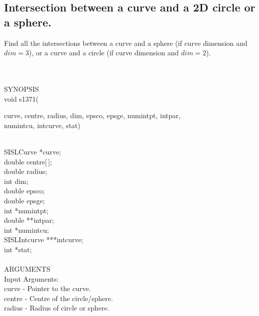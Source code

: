 \subsection{Intersection between a curve and a 2D circle or a sphere.}
\begin{minipg1}
  Find all the intersections between a curve and a sphere
  (if curve dimension and $dim=3$), or a curve and a circle
  (if curve dimension and $dim=2$).
\end{minipg1} \\ \\
SYNOPSIS\\
        \>void s1371(\begin{minipg3}
        {\fov curve}, {\fov centre}, {\fov radius}, {\fov dim}, {\fov epsco}, {\fov epsge}, {\fov numintpt}, {\fov intpar},\\
                        {\fov numintcu}, {\fov intcurve}, {\fov stat})
                \end{minipg3}\\[0.3ex]
                \>\>    SISLCurve       \>      *{\fov curve};\\
                \>\>    double  \>      {\fov centre}[\,];\\
                \>\>    double  \>      {\fov radius};\\
                \>\>    int     \>      {\fov dim};\\
                \>\>    double  \>      {\fov epsco};\\
                \>\>    double  \>      {\fov epsge};\\
                \>\>    int     \>      *{\fov numintpt};\\
                \>\>    double  \>      **{\fov intpar};\\
                \>\>    int     \>      *{\fov numintcu};\\
                \>\>    SISLIntcurve \> ***{\fov intcurve};\\
                \>\>    int     \>      *{\fov stat};\\
\\
ARGUMENTS\\
        \>Input Arguments:\\
        \>\>    {\fov curve}    \> - \> Pointer to the curve.\\
        \>\>    {\fov centre}   \> - \> Centre of the circle/sphere.\\
        \>\>    {\fov radius}   \> - \> Radius of circle or sphere.\\
